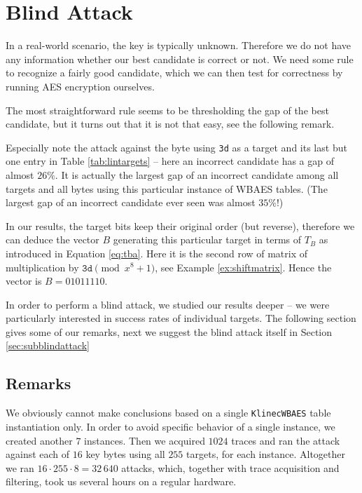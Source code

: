 \section{Blind Attack}
\label{sec:blindattack}

In a real-world scenario, the key is typically unknown. Therefore we do not have any information whether our best candidate is correct or not. We need some rule to recognize a fairly good candidate, which we can then test for correctness by running AES encryption ourselves.

The most straightforward rule seems to be thresholding the gap of the best candidate, but it turns out that it is not that easy, see the following remark.

\begin{remark}
\label{rem:false}
	Especially note the attack against the  byte using {\tt 3d} as a target and its last but one entry in Table \ref{tab:lintargets} -- here an incorrect candidate has a gap of almost $26\%$. It is actually the largest gap of an incorrect candidate among all targets and all bytes using this particular instance of WBAES tables. (The largest gap of an incorrect candidate ever seen was almost $35\%$!)
	
	In our results, the target bits keep their original order (but reverse), therefore we can deduce the vector $B$ generating this particular target in terms of $T_B$ as introduced in Equation \ref{eq:tba}. Here it is the second row of matrix of multiplication by $\texttt{3d}\pmod{x^8+1}$, see Example \ref{ex:shiftmatrix}. Hence the vector is $B = 01011110$.
\end{remark}

In order to perform a blind attack, we studied our results deeper -- we were particularly interested in success rates of individual targets. The following section gives some of our remarks, next we suggest the blind attack itself in Section \ref{sec:subblindattack}



\subsection{Remarks}
\label{sec:remarks}

We obviously cannot make conclusions based on a single {\tt KlinecWBAES} table instantiation only. In order to avoid specific behavior of a single instance, we created another $7$ instances. Then we acquired $1024$ traces and ran the attack against each of $16$ key bytes using all $255$ targets, for each instance. Altogether we ran $16\cdot255\cdot8=32\,640$ attacks, which, together with trace acquisition and filtering, took us several hours on a regular hardware.

